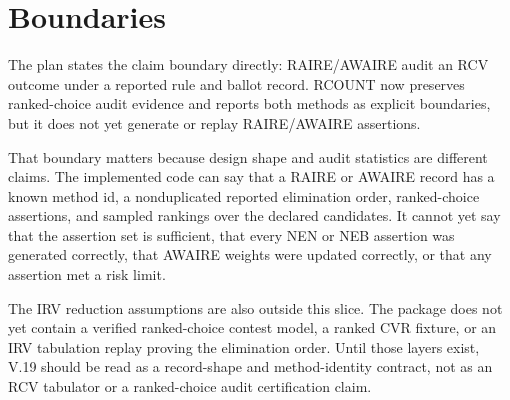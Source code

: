 \section{Boundaries}

The plan states the claim boundary directly: RAIRE/AWAIRE audit an RCV outcome
under a reported rule and ballot record. RCOUNT now preserves ranked-choice
audit evidence and reports both methods as explicit boundaries, but it does not
yet generate or replay RAIRE/AWAIRE assertions.

That boundary matters because design shape and audit statistics are different
claims. The implemented code can say that a RAIRE or AWAIRE record has a known
method id, a nonduplicated reported elimination order, ranked-choice assertions,
and sampled rankings over the declared candidates. It cannot yet say that the
assertion set is sufficient, that every NEN or NEB assertion was generated
correctly, that AWAIRE weights were updated correctly, or that any assertion met
a risk limit.

The IRV reduction assumptions are also outside this slice. The package does not
yet contain a verified ranked-choice contest model, a ranked CVR fixture, or an
IRV tabulation replay proving the elimination order. Until those layers exist,
V.19 should be read as a record-shape and method-identity contract, not as an
RCV tabulator or a ranked-choice audit certification claim.
